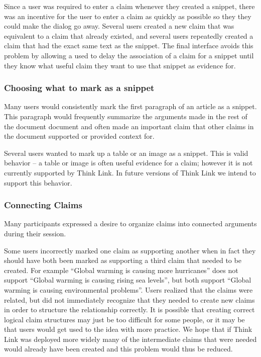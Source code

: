 \documentclass{chi2009}
\newcommand{\todo}[1]{}
\begin{document}
Since a user was required to enter a claim whenever they created a snippet, there was an incentive for the user to enter a claim as quickly as possible so they they could make the dialog go away. Several users created a new claim that was equivalent to a claim that already existed, and several users repeatedly created a claim that had the exact same text as the snippet. The final interface avoids this problem by allowing a used to delay the association of a claim for a snippet until they know what useful claim they want to use that snippet as evidence for.

\todo{Need to do some kind of evaluation to show that the new interface solves these problems}


\subsubsection{Choosing what to mark as a snippet}

Many users would consistently mark the first paragraph of an article as a snippet. This paragraph would frequently summarize the arguments made in the rest of the document document and often made an important claim that other claims in the document supported or provided context for. 

Several users wanted to mark up a table or an image as a snippet. This is valid behavior -- a table or image is often useful evidence for a claim; however it is not currently supported by Think Link. In future versions of Think Link we intend to support this behavior.


\subsubsection{Connecting Claims}

Many participants expressed a desire to organize claims into connected arguments during their session. 

Some users incorrectly marked one claim as supporting another when in fact they should have both been marked as supporting a third claim that needed to be created. For example ``Global warming is causing more hurricanes'' does not support ``Global warming is causing rising sea levels'', but both support ``Global warming is causing environmental problems''. Users realized that the claims were related, but did not immediately recognize that they needed to create new claims in order to structure the relationship correctly. It is possible that creating correct logical claim structures may just be too difficult for some people, or it may be that users would get used to the idea with more practice. We hope that if Think Link was deployed more widely many of the intermediate claims that were needed would already have been created and this problem would thus be reduced.
\end{document}
